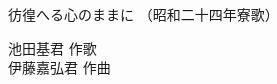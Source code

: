 \documentclass[10pt,b5j]{tarticle} %
\begin{document}
\begin{minipage}[c]{0.7\hsize} %
    \begin{center}
        {\LARGE
            彷徨へる心のままに %
        }
        {\small 
            （昭和二十四年寮歌） %
        }
    \end{center}
\end{minipage}
\begin{minipage}[c]{0.3\hsize} %
    \begin{flushright} %
        池田基君 作歌\\伊藤嘉弘君 作曲 %
    \end{flushright}
\end{minipage}
\end{document}
